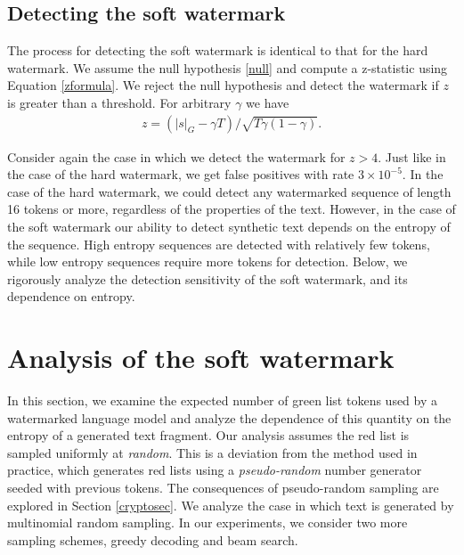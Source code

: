 \documentclass{article}
\theoremstyle{plain}
\theoremstyle{definition}
\theoremstyle{remark}
\begin{document}
\subsection{Detecting the soft watermark}

The process for detecting the soft watermark is identical to that for the hard watermark.  We assume the null hypothesis \eqref{null} and compute a z-statistic using Equation \eqref{zformula}.  We reject the null hypothesis and detect the watermark if $z$ is greater than a threshold.  For arbitrary $\gamma$ we have 
\begin{align} \label{zformula_generalized}
z = (|s|_G - \gamma T)/\sqrt{T\gamma(1-\gamma)}.
\end{align}

 Consider again the case in which we detect the watermark for $z>4.$  Just like in the case of the hard watermark, we get false positives with rate $3\times 10^{-5}.$  In the case of the hard watermark, we could detect any watermarked sequence of length 16 tokens or more, regardless of the properties of the text.  However, in the case of the soft watermark our ability to detect synthetic text depends on the entropy of the sequence. High entropy sequences are detected with relatively few tokens, while low entropy sequences require more tokens for detection.   
Below, we rigorously analyze the detection sensitivity of the soft watermark, and its dependence on entropy.  
 
\section{Analysis of the soft watermark}
In this section, we examine the expected number of green list tokens used by a watermarked language model and analyze the dependence of this quantity on the entropy of a generated text fragment.  Our analysis assumes the red list is sampled uniformly at {\em random}. 
This is a deviation from the method used in practice, which generates red lists using a {\em pseudo-random} number generator seeded with previous tokens. The consequences of pseudo-random sampling are explored in Section \ref{cryptosec}.  We analyze the case in which text is generated by multinomial random sampling.  In our experiments, we consider two more sampling schemes, greedy decoding and beam search.
\end{document}
